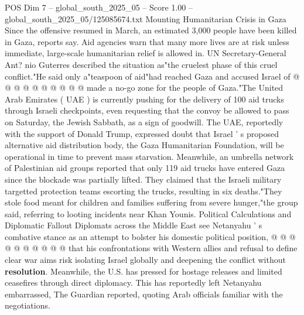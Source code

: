\begin{textsample}{POS Dim 7 – global\_south\_2025\_05 – Score 1.00 – global\_south\_2025\_05/125085674.txt}
Mounting Humanitarian Crisis in Gaza Since the offensive resumed in March, an estimated 3,000 people have been killed in Gaza, reports say.
Aid agencies warn that many more lives are at risk unless immediate, large-scale humanitarian relief is allowed in.
UN Secretary-General Ant? nio Guterres described the situation as"the cruelest phase of this cruel conflict."He said only a"teaspoon of aid"had reached Gaza and accused Israel of @ @ @ @ @ @ @ @ @ @ made a no-go zone for the people of Gaza."The United Arab Emirates ( UAE ) is currently pushing for the delivery of 100 aid trucks through Israeli checkpoints, even requesting that the convoy be allowed to pass on Saturday, the Jewish Sabbath, as a sign of goodwill.
The UAE, reportedly with the support of Donald Trump, expressed doubt that Israel ' s proposed alternative aid distribution body, the Gaza Humanitarian Foundation, will be operational in time to prevent mass starvation.
Meanwhile, an umbrella network of Palestinian aid groups reported that only 119 aid trucks have entered Gaza since the blockade was partially lifted.
They claimed that the Israeli military targetted protection teams escorting the trucks, resulting in six deaths."They stole food meant for children and families suffering from severe hunger,"the group said, referring to looting incidents near Khan Younis.
Political Calculations and Diplomatic Fallout Diplomats across the Middle East see Netanyahu ' s combative stance as an attempt to bolster his domestic political position, @ @ @ @ @ @ @ @ @ @ that his confrontations with Western allies and refusal to define clear war aims risk isolating Israel globally and deepening the conflict without \textbf{resolution}.
Meanwhile, the U.S. has pressed for hostage releases and limited ceasefires through direct diplomacy.
This has reportedly left Netanyahu embarrassed, The Guardian reported, quoting Arab officials familiar with the negotiations.

\end{textsample}
